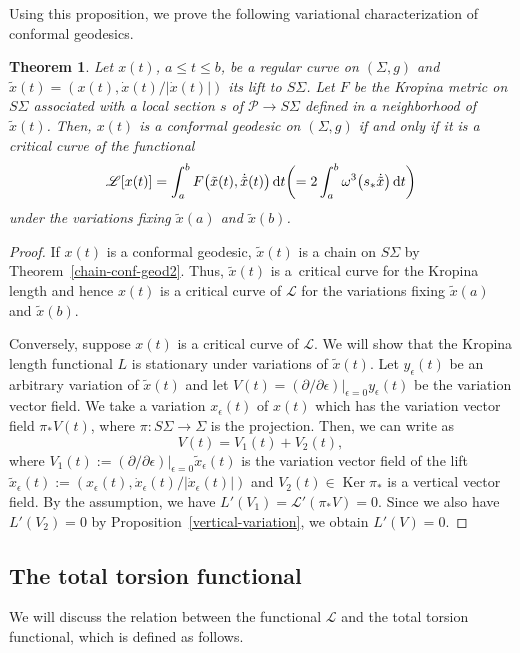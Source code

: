 \documentclass[pdftex]{sigma}
\numberwithin{equation}{section}
\newtheorem{Theorem}{Theorem}[section]
\begin{document}
Using this proposition, we prove the following variational characterization of conformal geodesics.

\begin{Theorem}\label{variational-characterization}
Let $x(t)$, $a\le t\le b$, be a regular curve on $(\Sigma, g)$ and $\tilde x(t)=(x(t), \dot x(t)/|\dot x(t)|)$ its lift to $S\Sigma$. Let $F$ be the Kropina metric on $S\Sigma$ associated with a local section $s$ of $\mathcal{P}\to S\Sigma$ defined in a neighborhood of $\tilde x(t)$. Then, $x(t)$ is a conformal geodesic on $(\Sigma, g)$ if and only if it is a critical curve of the functional
\begin{equation}\label{conf-geod-functional}
\mathscr{L}[x(t)]=\int_a^b F\bigl(\tilde x(t), \dot{\tilde x}(t)\bigr)\, {\rm d}t
\biggl(=2\int_a^b \omega^3\bigl(s_*\dot{\tilde x}\bigr)\,{\rm d}t\biggr)
\end{equation}
under the variations fixing $\tilde x(a)$ and $\tilde x(b)$.
\end{Theorem}
\begin{proof}
If $x(t)$ is a conformal geodesic, $\tilde x(t)$ is a chain on $S\Sigma$ by
Theorem~\ref{chain-conf-geod2}. Thus, $\tilde x(t)$ is a~critical curve for the Kropina length and hence $x(t)$ is a critical curve of $\mathscr{L}$ for the variations fixing $\tilde x(a)$ and $\tilde x(b)$.

Conversely, suppose $x(t)$ is a critical curve of $\mathscr{L}$. We will show that the Kropina length functional $L$ is stationary under variations of $\tilde x(t)$. Let $y_\epsilon(t)$ be an arbitrary variation of $\tilde x(t)$ and let $V(t)=(\partial/\partial \epsilon)|_{\epsilon=0}y_\epsilon(t)$ be the variation vector field. We take a variation $x_\epsilon(t)$ of $x(t)$ which has the variation vector field $\pi_* V(t)$, where $\pi\colon S\Sigma\to \Sigma$ is the projection. Then, we can write as
\[
V(t)=V_1(t)+V_2(t),
\]
where $V_1(t):=(\partial/\partial \epsilon)|_{\epsilon=0}\tilde x_\epsilon (t)$ is the variation vector field of the lift $\tilde x_\epsilon (t):=(x_\epsilon(t), \dot x_\epsilon(t)/|\dot x_\epsilon (t)|)$ and $V_2(t)\in \operatorname{Ker} \pi_*$ is a vertical vector field. By the assumption, we have $L'(V_1)=\mathscr{L}'(\pi_*V)=0$. Since we also have $L'(V_2)=0$ by Proposition~\ref{vertical-variation}, we obtain $L'(V)=0$.
\end{proof}

\subsection{The total torsion functional}
We will discuss the relation between the functional $\mathscr{L}$ and the total torsion functional, which is defined as follows.
\end{document}
